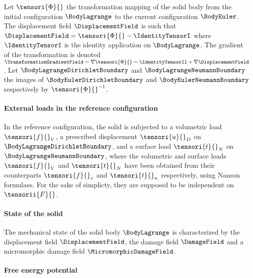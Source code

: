 Let $\tensori{\Phi}{}$ the transformation mapping of the solid body from the initial configuration $\BodyLagrange$ to the current configuration $\BodyEuler$.
The displacement field $\DisplacementField$ is such that $\DisplacementField = \tensori{\Phi}{} - \IdentityTensorI$ where $\IdentityTensorI$
is the identity application on $\BodyLagrange$.
The gradient of the transformation is denoted $\TransformationGradientField = \nabla \tensori{\Phi}{} = \IdentityTensorII + \nabla \DisplacementField$.
Let $\BodyLagrangeDirichletBoundary$ and $\BodyLagrangeNeumannBoundary$ the images of $\BodyEulerDirichletBoundary$ and $\BodyEulerNeumannBoundary$ respectively by $\tensori{\Phi}{}^{-1}$.

\paragraph{External loads in the reference configuration} 

In the reference configuration, the solid is subjected to a volumetric load
$\tensori{f}{}_V$, a prescribed displacement $\tensori{u}{}_D$ on $\BodyLagrangeDirichletBoundary$, and a surface load $\tensori{t}{}_N$ on $\BodyLagrangeNeumannBoundary$, where the volumetric and surface loads $\tensori{f}{}_V$ and $\tensori{t}{}_N$ have been obtained from their counterparts
$\tensori{f}{}_v$ and $\tensori{t}{}_n$ respectively, using Nanson formulaes. For the sake of simplicty, they are supposed to be independent
on $\tensorii{F}{}$.

\paragraph{State of the solid} The mechanical state of the solid body $\BodyLagrange$ is characterized by the displacement field $\DisplacementField$,
the damage field $\DamageField$ and a micromorphic damage field $\MicromorphicDamageField$.

\paragraph{Free energy potential}

